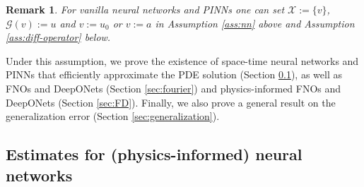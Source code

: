\documentclass{article}
\numberwithin{equation}{section}
\newcommand{\cG}{\mathcal{G}}
\newcommand{\cX}{\mathcal{X}}
\newcommand{\1}{\mathbbm{1}}
\newtheorem{remark}[theorem]{Remark}
\begin{document}
\begin{remark}
For vanilla neural networks and PINNs one can set $\cX := \{v\}$, $\cG(v) := u$ and $v:=u_0$ or $v:=a$ in Assumption \ref{ass:nn} above and Assumption \ref{ass:diff-operator} below.
\end{remark}

Under this assumption, we prove the existence of space-time neural networks and PINNs that efficiently approximate the PDE solution (Section \ref{sec:taylor}), as well as FNOs and DeepONets (Section \ref{sec:fourier}) and physics-informed FNOs and DeepONets (Section \ref{sec:FD}). Finally, we also prove a general result on the generalization error (Section \ref{sec:generalization}).

\subsection{Estimates for (physics-informed) neural networks}\label{sec:taylor}
\end{document}
